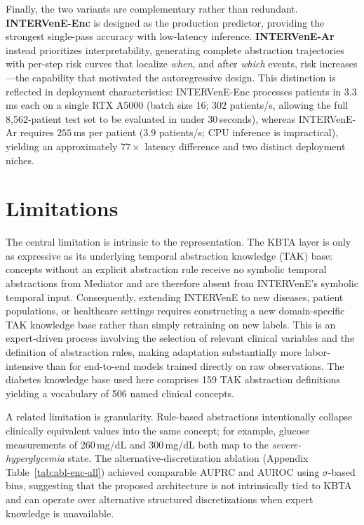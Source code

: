 \documentclass[letterpaper]{article} %
\begin{document}
Finally, the two variants are complementary rather than redundant. \textbf{INTERVenE-Enc} is designed as the production predictor, providing the strongest single-pass accuracy with low-latency inference. \textbf{INTERVenE-Ar} instead prioritizes interpretability, generating complete abstraction trajectories with per-step risk curves that localize \emph{when}, and after \emph{which} events, risk increases---the capability that motivated the autoregressive design. This distinction is reflected in deployment characteristics: INTERVenE-Enc processes patients in $3.3$\,ms each on a single RTX A5000 (batch size 16; $302$ patients/s, allowing the full 8{,}562-patient test set to be evaluated in under 30\,seconds), whereas INTERVenE-Ar requires $255$\,ms per patient ($3.9$ patients/s; CPU inference is impractical), yielding an approximately $77\times$ latency difference and two distinct deployment niches.

\section{Limitations}

The central limitation is intrinsic to the representation. The KBTA layer is only as expressive as its underlying temporal abstraction knowledge (TAK) base: concepts without an explicit abstraction rule receive no symbolic temporal abstractions from Mediator and are therefore absent from INTERVenE's symbolic temporal input. Consequently, extending INTERVenE to new diseases, patient populations, or healthcare settings requires constructing a new domain-specific TAK knowledge base rather than simply retraining on new labels. This is an expert-driven process involving the selection of relevant clinical variables and the definition of abstraction rules, making adaptation substantially more labor-intensive than for end-to-end models trained directly on raw observations. The diabetes knowledge base used here comprises 159 TAK abstraction definitions yielding a vocabulary of 506 named clinical concepts.

A related limitation is granularity. Rule-based abstractions intentionally collapse clinically equivalent values into the same concept; for example, glucose measurements of 260\,mg/dL and 300\,mg/dL both map to the \emph{severe-hyperglycemia} state. The alternative-discretization ablation (Appendix Table~\ref{tab:abl-enc-all}) achieved comparable AUPRC and AUROC using $\sigma$-based bins, suggesting that the proposed architecture is not intrinsically tied to KBTA and can operate over alternative structured discretizations when expert knowledge is unavailable.
\end{document}
